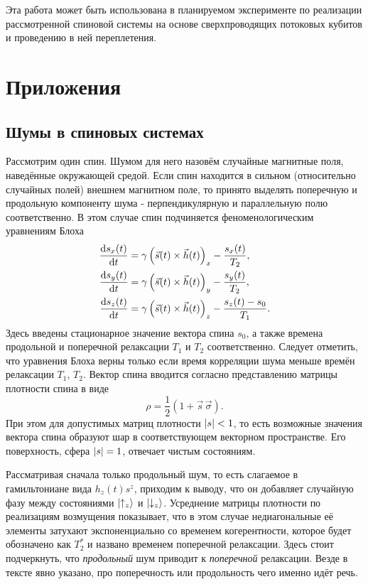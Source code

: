 \documentclass[a4paper,12pt]{article}
\theoremstyle{plain} %
\theoremstyle{definition} %
\theoremstyle{remark} %
\begin{document}
Эта работа может быть использована в планируемом эксперименте по реализации рассмотренной спиновой системы на основе сверхпроводящих потоковых кубитов и проведению в ней переплетения.

\pagebreak

\section{Приложения}

\subsection{Шумы в спиновых системах} \label{subsec:appendix}
Рассмотрим один спин. Шумом для него назовём случайные магнитные поля, наведённые окружающей средой. Если спин находится в сильном (относительно случайных полей) внешнем магнитном поле, то принято выделять поперечную и продольную компоненту шума - перпендикулярную и параллельную полю соответственно. В этом случае спин подчиняется феноменологическим уравнениям Блоха \cite{abragam}
\begin{equation}
\begin{split}
    \dv{s_x(t)}{t} &= \gamma \left( \vec{s}(t) \times \vec{h}(t) \right)_x - \frac{s_x(t)}{T_2}, \\
    \dv{s_y(t)}{t} &= \gamma \left( \vec{s}(t) \times \vec{h}(t) \right)_y - \frac{s_y(t)}{T_2}, \\
    \dv{s_z(t)}{t} &= \gamma \left( \vec{s}(t) \times \vec{h}(t) \right)_z - \frac{s_z(t) - s_0}{T_1}.
\end{split}
\end{equation}
Здесь введены стационарное значение вектора спина $s_0$, а также времена продольной и поперечной релаксации $T_1$ и $T_2$ соответственно. Следует отметить, что уравнения Блоха верны только если время корреляции шума меньше времён релаксации $T_1$, $T_2$. Вектор спина вводится согласно представлению матрицы плотности спина в виде
\begin{equation}
    \rho = \frac{1}{2} (1 + \vec{s} \, \vec{\sigma}).
\end{equation}
При этом для допустимых матриц плотности $\abs{s} < 1$, то есть возможные значения вектора спина образуют шар в соответствующем векторном пространстве. Его поверхность, сфера $\abs{s} = 1$, отвечает чистым состояниям.

Рассматривая сначала только продольный шум, то есть слагаемое в гамильтониане вида $h_z(t) s^z$, приходим к выводу, что он добавляет случайную фазу между состояниями $\ket{\uparrow_z}$ и $\ket{\downarrow_z}$. Усреднение матрицы плотности по реализациям возмущения показывает, что в этом случае недиагональные её элементы затухают экспоненциально со временем когерентности, которое будет обозначено как $T_2^*$ и названо временем поперечной релаксации. Здесь стоит подчеркнуть, что \textit{продольный} шум приводит к \textit{поперечной} релаксации. Везде в тексте явно указано, про поперечность или продольность чего именно идёт речь.
\end{document}
